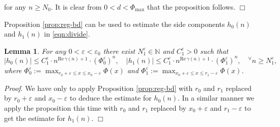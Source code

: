 \documentclass[a4paper,12pt]{article}
\theoremstyle{plain}
\newtheorem{lemma}[theorem]{Lemma}
\def\rRe{\mathrm{Re}}
\def\N{\mathbb{N}}
\def\ve{\varepsilon}
\def\Phim{\Phi_{\scriptstyle \mathrm{max}}}
\begin{document}
for any $n \ge N_0$. 
It is clear from $0 < d < \Phim$ that the proposition follows. 
\hfill $\Box$ \par\medskip
Proposition \ref{prop:reg-bd} can be used to estimate the side components $h_0(n)$ 
and $h_1(n)$ in \eqref{eqn:divide}. 
\begin{lemma} \label{lem:side} 
For any $0 < \ve < \ve_0$ there exist $N_1^{\ve} \in \N$ and $C_1^{\ve} > 0$ 
such that  
\[
| h_0(n) | \le C_1^{\ve} \cdot n^{\rRe \, \gamma(n) + 1} \cdot (\Phi_0^{\ve})^n, 
\quad 
| h_1(n) | \le C_1^{\ve} \cdot n^{\rRe \, \gamma(n) + 1} \cdot (\Phi_1^{\ve})^n,  
\quad 
{}^{\forall} n \ge N_1^{\ve},  
\]
where $\Phi_0^{\ve} := \displaystyle \max_{r_0 + \ve \le x \le x_0-\ve} \Phi(x)$ 
and $\Phi_1^{\ve} := \displaystyle \max_{x_0 + \ve \le x \le r_1-\ve} \Phi(x)$.   
\end{lemma}
{\it Proof}. 
We have only to apply Proposition \ref{prop:reg-bd} with $r_0$ and $r_1$ 
replaced by $r_0 + \ve$ and $x_0-\ve$ to deduce the estimate for $h_0(n)$.  
In a similar manner we apply the proposition this time with $r_0$ and $r_1$ 
replaced by $x_0 + \ve$ and $r_1-\ve$ to get the estimate for $h_1(n)$. 
\hfill $\Box$ 
\end{document}
